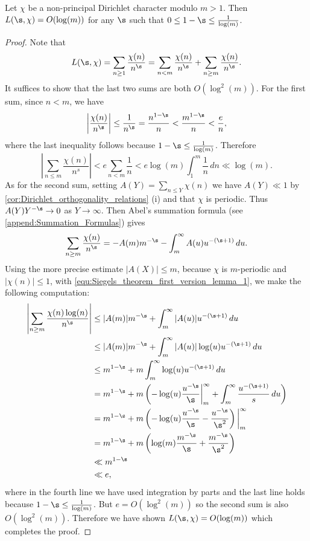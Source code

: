       \begin{lemma}\label{lem:Siegels_theorem_first_version_lemma}
        Let $\chi$ be a non-principal Dirichlet character modulo $m > 1$. Then $L(\s,\chi) = O(\log(m))$ for any $\s$ such that $0 \le 1-\s \le \frac{1}{\log(m)}$.
      \end{lemma}
      \begin{proof}
        Note that
        \[
          L(\s,\chi) = \sum_{n \ge 1}\frac{\chi(n)}{n^{\s}} = \sum_{n < m}\frac{\chi(n)}{n^{\s}}+\sum_{n \ge m}\frac{\chi(n)}{n^{\s}}.
        \]
        It suffices to show that the last two sums are both $O(\log^{2}(m))$. For the first sum, since $n < m$, we have
        \[
          \left|\frac{\chi(n)}{n^{\s}}\right| \le \frac{1}{n^{\s}} = \frac{n^{1-\s}}{n} < \frac{m^{1-\s}}{n} < \frac{e}{n},
        \]
        where the last inequality follows because $1-\s \le \frac{1}{\log(m)}$. Therefore
        \[
          \left|\sum_{n \le m}\frac{\chi(n)}{n^{s}}\right| < e\sum_{n < m}\frac{1}{n} < e\log(m)\int_{1}^{m}\frac{1}{n}\,dn \ll \log(m).
        \]
        As for the second sum, setting $A(Y) = \sum_{n \le Y}\chi(n)$ we have $A(Y) \ll 1$ by \cref{cor:Dirichlet_orthogonality_relations} (i) and that $\chi$ is periodic. Thus $A(Y)Y^{-\s} \to 0$ as $Y \to \infty$. Then Abel's summation formula (see \cref{append:Summation_Formulas}) gives
        \begin{equation}\label{equ:Siegels_theorem_first_version_lemma_1}
          \sum_{n \ge m}\frac{\chi(n)}{n^{\s}} = -A(m)m^{-\s}-\int_{m}^{\infty}A(u)u^{-(\s+1)}\,du.
        \end{equation}
        Using the more precise estimate $|A(X)| \le m$, because $\chi$ is $m$-periodic and $|\chi(n)| \le 1$, with \cref{equ:Siegels_theorem_first_version_lemma_1}, we make the following computation:
        \begin{align*}
          \left|\sum_{n \ge m}\frac{\chi(n)\log(n)}{n^{\s}}\right| &\le |A(m)|m^{-\s}+\int_{m}^{\infty}|A(u)|u^{-(\s+1)}\,du \\
          &\le |A(m)|m^{-\s}+\int_{m}^{\infty}|A(u)|\log(u)u^{-(\s+1)}\,du \\
          &\le m^{1-\s}+m\int_{m}^{\infty}\log(u)u^{-(\s+1)}\,du \\
          &= m^{1-\s}+m\left(-\log(u)\frac{u^{-\s}}{\s}\bigg|_{m}^{\infty}+\int_{m}^{\infty}\frac{u^{-(\s+1)}}{s}\,du\right) \\
          &= m^{1-\s}+m\left(-\log(u)\frac{u^{-\s}}{\s}-\frac{u^{-\s}}{\s^{2}}\right)\bigg|_{m}^{\infty} \\
          &= m^{1-\s}+m\left(\log(m)\frac{m^{-\s}}{\s}+\frac{m^{-\s}}{\s^{2}}\right) \\
          &\ll m^{1-\s} \\
          &\ll e,
        \end{align*}
        where in the fourth line we have used integration by parts and the last line holds because $1-\s \le \frac{1}{\log(m)}$. But $e = O(\log^{2}(m))$ so the second sum is also $O(\log^{2}(m))$. Therefore we have shown $L(\s,\chi) = O(\log(m))$ which completes the proof.
      \end{proof}

